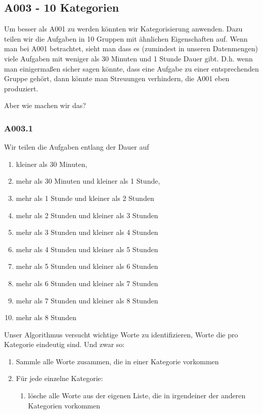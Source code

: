\newpage{}

\subsection{A003 - 10 Kategorien}

Um besser als A001 zu werden könnten wir Kategorisierung anwenden.
Dazu teilen wir die Aufgaben in 10 Gruppen mit ähnlichen Eigenschaften auf.
Wenn man bei A001 betrachtet, sieht man dass es (zumindest in unseren Datenmengen) viele Aufgaben mit weniger als 30 Minuten und 1 Stunde Dauer gibt. D.h. wenn man einigermaßen sicher sagen könnte, dass eine Aufgabe zu einer entsprechenden Gruppe gehört, dann könnte man Streuungen verhindern, die A001 eben produziert.

Aber wie machen wir das?

\subsubsection{A003.1}

Wir teilen die Aufgaben entlang der Dauer auf
\begin{enumerate}
\tightlist
\item kleiner als 30 Minuten,
\item mehr als 30 Minuten und kleiner als 1 Stunde,
\item mehr als 1 Stunde und kleiner als 2 Stunden
\item mehr als 2 Stunden und kleiner als 3 Stunden
\item mehr als 3 Stunden und kleiner als 4 Stunden
\item mehr als 4 Stunden und kleiner als 5 Stunden
\item mehr als 5 Stunden und kleiner als 6 Stunden
\item mehr als 6 Stunden und kleiner als 7 Stunden
\item mehr als 7 Stunden und kleiner als 8 Stunden
\item mehr als 8 Stunden
\end{enumerate}

Unser Algorithmus versucht wichtige Worte zu identifizieren, Worte die pro Kategorie eindeutig sind. Und zwar so:
\begin{enumerate}
\tightlist
\item Sammle alle Worte zusammen, die in einer Kategorie vorkommen
\item Für jede einzelne Kategorie:
    \begin{enumerate}
        \tightlist
        \item lösche alle Worte aus der eigenen Liste, die in irgendeiner der anderen Kategorien vorkommen
    \end{enumerate}
\end{enumerate}